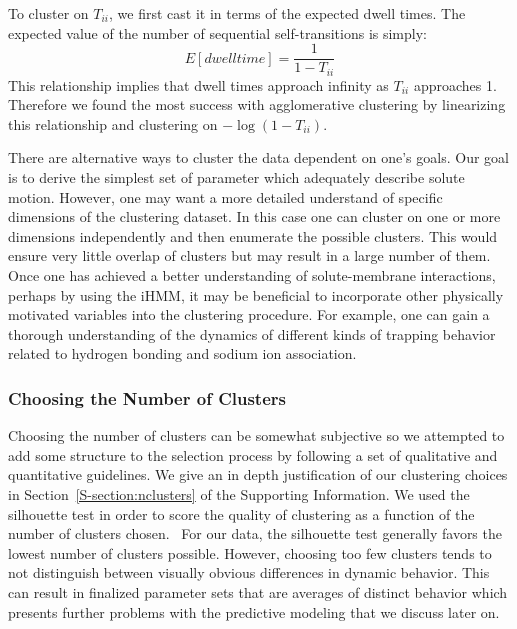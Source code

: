 \documentclass[journal=jpcbfk,manuscript=article]{achemso}
\begin{document}
  To cluster on $T_{ii}$, we first cast it in terms of the expected dwell times. The expected
  value of the number of sequential self-transitions is simply:
  \begin{equation}  
   E[dwell time] = \frac{1}{1 - T_{ii}}
   \label{eqn:dwell_times}
  \end{equation}  
  This relationship implies that dwell times approach infinity as $T_{ii}$ approaches
  1. Therefore we found the most success with agglomerative clustering by linearizing this
  relationship and clustering on $-\log(1 - T_{ii})$.
  
  There are alternative ways to cluster the data dependent on one's goals. Our goal is
  to derive the simplest set of parameter which adequately describe solute motion. 
  However, one may want a more detailed understand of specific dimensions of the 
  clustering dataset. In this case one can cluster on one or more dimensions independently
  and then enumerate the possible clusters. This would ensure very little overlap of
  clusters but may result in a large number of them. Once one has achieved a better 
  understanding of solute-membrane interactions, perhaps by using the iHMM, it may be
  beneficial to incorporate other physically motivated variables into the clustering
  procedure. For example, one can gain a thorough understanding of the dynamics of
  different kinds of trapping behavior related to hydrogen bonding and sodium ion association.
 
  \subsubsection*{Choosing the Number of Clusters}

  Choosing the number of clusters can be somewhat subjective so we attempted to add some
  structure to the selection process by following a set of qualitative and quantitative 
  guidelines. We give an in depth justification of our clustering choices in 
  Section~\ref{S-section:nclusters} of the Supporting Information. We used the silhouette
  test in order to score the quality of clustering as a function of the number of clusters
  chosen.~\cite{kaufman_finding_2009} For our data, the silhouette test generally favors 
  the lowest number of clusters possible. However, choosing too few clusters tends to not
  distinguish between visually obvious differences in dynamic behavior. This can result 
  in finalized parameter sets that are averages of distinct behavior which presents 
  further problems with the predictive modeling that we discuss later on. 
  
\end{document}
